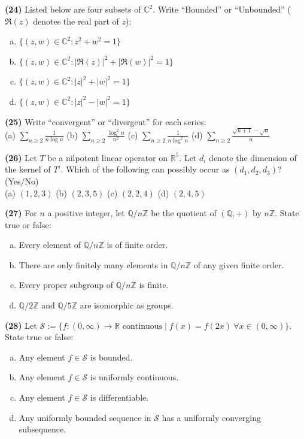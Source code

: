 \documentclass[11pt,a4paper]{article}
\newcommand{\Z}{\mathbb{Z}}
\newcommand{\Q}{\mathbb{Q}}
\newcommand{\R}{\mathbb{R}}
\newcommand{\C}{\mathbb{C}}
\newcommand{\qitem}[1]{\par\medskip\noindent\textbf{#1}\hspace{0.5em}}
\begin{document}
\qitem{(24)} Listed below are four subsets of $\C^2$. Write ``Bounded'' or ``Unbounded'' ($\Re(z)$ denotes the real part of $z$):
\begin{enumerate}[(a)]
  \item $\{(z, w) \in \C^2 : z^2 + w^2 = 1\}$
  \item $\{(z, w) \in \C^2 : |\Re(z)|^2 + |\Re(w)|^2 = 1\}$
  \item $\{(z, w) \in \C^2 : |z|^2 + |w|^2 = 1\}$
  \item $\{(z, w) \in \C^2 : |z|^2 - |w|^2 = 1\}$
\end{enumerate}

\qitem{(25)} Write ``convergent'' or ``divergent'' for each series:\\
(a) $\displaystyle\sum_{n \ge 2} \frac{1}{n\log n}$ \quad
(b) $\displaystyle\sum_{n \ge 2} \frac{\log^2 n}{n^2}$ \quad
(c) $\displaystyle\sum_{n \ge 2} \frac{1}{n\log^2 n}$ \quad
(d) $\displaystyle\sum_{n \ge 2} \frac{\sqrt{n+1} - \sqrt{n}}{n}$

\qitem{(26)} Let $T$ be a nilpotent linear operator on $\R^5$. Let $d_i$ denote the dimension of the kernel of $T^i$. Which of the following can possibly occur as $(d_1, d_2, d_3)$? (Yes/No)\\
(a) $(1, 2, 3)$ \qquad (b) $(2, 3, 5)$ \qquad (c) $(2, 2, 4)$ \qquad (d) $(2, 4, 5)$

\qitem{(27)} For $n$ a positive integer, let $\Q/n\Z$ be the quotient of $(\Q, +)$ by $n\Z$. State true or false:
\begin{enumerate}[(a)]
  \item Every element of $\Q/n\Z$ is of finite order.
  \item There are only finitely many elements in $\Q/n\Z$ of any given finite order.
  \item Every proper subgroup of $\Q/n\Z$ is finite.
  \item $\Q/2\Z$ and $\Q/5\Z$ are isomorphic as groups.
\end{enumerate}

\qitem{(28)} Let $\mathcal{S} := \{f : (0, \infty) \to \R \text{ continuous} \mid f(x) = f(2x)\ \forall x \in (0, \infty)\}$. State true or false:
\begin{enumerate}[(a)]
  \item Any element $f \in \mathcal{S}$ is bounded.
  \item Any element $f \in \mathcal{S}$ is uniformly continuous.
  \item Any element $f \in \mathcal{S}$ is differentiable.
  \item Any uniformly bounded sequence in $\mathcal{S}$ has a uniformly converging subsequence.
\end{enumerate}
\end{document}
